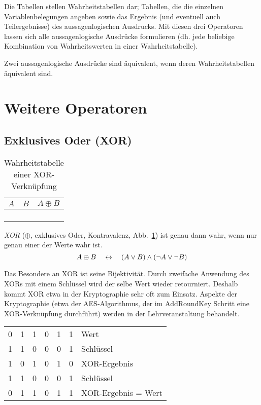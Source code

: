 Die Tabellen stellen Wahrheitstabellen dar; Tabellen, die die einzelnen Variablenbelegungen angeben sowie das Ergebnis (und eventuell auch Teilergebnisse) des aussagenlogischen Ausdrucks. Mit diesen drei Operatoren lassen sich alle aussagenlogische Ausdrücke formulieren (dh. jede beliebige Kombination von Wahrheitswerten in einer Wahrheitstabelle).

Zwei aussagenlogische Ausdrücke sind äquivalent, wenn deren Wahrheitstabellen äquivalent sind.
%
\section{Weitere Operatoren}
%
\subsection{Exklusives Oder (XOR)}
%
\begin{table}[ht]
 \begin{center}
  \begin{tabular}{cc|c}
   \hline
    $A$ & $B$ & $A \oplus{} B$ \\
   \hline \hline
    \F  & \F  & \F \\
    \F  & \T  & \T \\
    \T  & \F  & \T \\
    \T  & \T  & \F \\
  \end{tabular}
  \caption{Wahrheitstabelle einer XOR-Verknüpfung}
  \label{fig:xor_operator}
 \end{center}
\end{table}
%
\emph{XOR} ($\oplus$, exklusives Oder, Kontravalenz, Abb.~\ref{fig:xor_operator}) ist genau dann wahr, wenn nur genau einer der Werte wahr ist.
\[
  A \oplus B \quad\leftrightarrow\quad (A \lor B) \land (\neg A \lor \neg B)
\]

Das Besondere an XOR ist seine Bijektivität. Durch zweifache Anwendung des XORs mit einem Schlüssel wird der selbe Wert wieder retourniert. Deshalb kommt XOR etwa in der Kryptographie sehr oft zum Einsatz. Aspekte der Kryptographie (etwa der AES-Algorithmus, der im AddRoundKey Schritt eine XOR-Verknüpfung durchführt) werden in der Lehrveranstaltung \courseiis{} behandelt.
%
\begin{table}[ht]
  \begin{center}
    \begin{tabular}{cccccc|l}
      0&1&1&0&1&1& Wert \\
      1&1&0&0&0&1& Schlüssel \\
    \hline
      1&0&1&0&1&0& XOR-Ergebnis \\
      1&1&0&0&0&1& Schlüssel \\
    \hline
      0&1&1&0&1&1& XOR-Ergebnis = Wert
    \end{tabular}
  \end{center}
\end{table}

